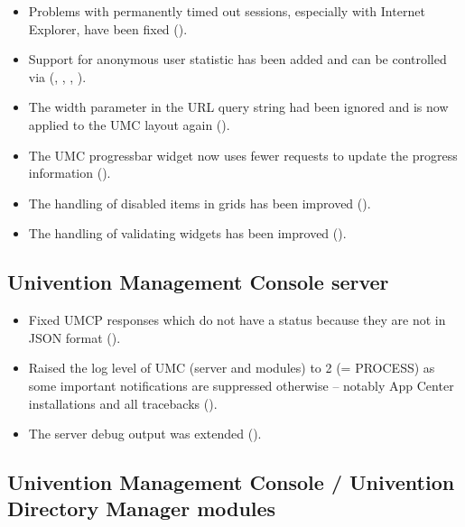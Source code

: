 \begin{itemize}
\item Problems with permanently timed out sessions, especially with Internet Explorer,
  have been fixed ().

\item Support for anonymous user statistic has been added and can be controlled
  via  (, , ,
  ).

\item The width parameter in the URL query string had been ignored and
  is now applied to the UMC layout again ().

\item The UMC progressbar widget now uses fewer requests to update
  the progress information ().

\item The handling of disabled items in grids has been improved ().

\item The handling of validating widgets has been improved ().
\end{itemize}

\subsection{Univention Management Console server}
\begin{itemize}
\item Fixed UMCP responses which do not have a status because they are
  not in JSON format ().
\item Raised the log level of UMC (server and modules) to 2 (= PROCESS) as some
  important notifications are suppressed otherwise -- notably App Center
  installations and all tracebacks ().
\item The server debug output was extended ().
\end{itemize}

\subsection{Univention Management Console / Univention Directory
  Manager modules}

